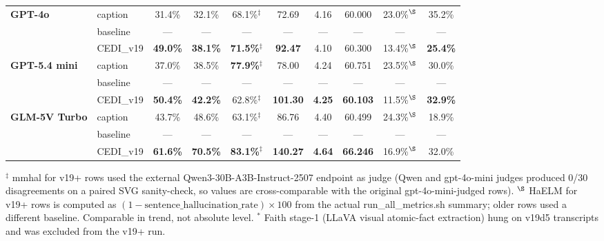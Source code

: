 \begin{table}[t]
\begin{tabular}{@{}l|l|cccccccc@{}}
\multirow{3}{*}{\parbox{2.5cm}{\centering\textbf{GPT-4o}}}
  & caption    & 31.4\% & 32.1\% & 68.1\%$^\ddagger$ & 72.69 & 4.16 & 60.000 & 23.0\%$^\S$ & 35.2\% \\
  & baseline   & --- & --- & --- & --- & --- & --- & --- & --- \\
\rowcolor[HTML]{E6F2FF}
  \multicolumn{1}{l}{\cellcolor[HTML]{E6F2FF}} & CEDI\_v19 & \textbf{49.0\%} & \textbf{38.1\%} & \textbf{71.5\%}$^\ddagger$ & \textbf{92.47} & 4.10 & 60.300 & 13.4\%$^\S$ & \textbf{25.4\%} \\
\midrule
\multirow{3}{*}{\parbox{2.5cm}{\centering\textbf{GPT-5.4 mini}}}
  & caption    & 37.0\% & 38.5\% & \textbf{77.9\%}$^\ddagger$ & 78.00 & 4.24 & 60.751 & 23.5\%$^\S$ & 30.0\% \\
  & baseline   & --- & --- & --- & --- & --- & --- & --- & --- \\
\rowcolor[HTML]{E6F2FF}
  \multicolumn{1}{l}{\cellcolor[HTML]{E6F2FF}} & CEDI\_v19 & \textbf{50.4\%} & \textbf{42.2\%} & 62.8\%$^\ddagger$ & \textbf{101.30} & \textbf{4.25} & \textbf{60.103} & 11.5\%$^\S$ & \textbf{32.9\%} \\
\midrule
\multirow{3}{*}{\parbox{2.5cm}{\centering\textbf{GLM-5V Turbo}}}
  & caption    & 43.7\% & 48.6\% & 63.1\%$^\ddagger$ & 86.76 & 4.40 & 60.499 & 24.3\%$^\S$ & 18.9\% \\
  & baseline   & --- & --- & --- & --- & --- & --- & --- & --- \\
\rowcolor[HTML]{E6F2FF}
  \multicolumn{1}{l}{\cellcolor[HTML]{E6F2FF}} & CEDI\_v19 & \textbf{61.6\%} & \textbf{70.5\%} & \textbf{83.1\%}$^\ddagger$ & \textbf{140.27} & \textbf{4.64} & \textbf{66.246} & 16.9\%$^\S$ & 32.0\% \\
\bottomrule
\end{tabular}

\vspace{2pt}
\footnotesize
\noindent
$^\ddagger$ mmhal for v19+ rows used the external Qwen3-30B-A3B-Instruct-2507 endpoint as judge (Qwen and gpt-4o-mini judges produced 0/30 disagreements on a paired SVG sanity-check, so values are cross-comparable with the original gpt-4o-mini-judged rows).
\quad
$^\S$ HaELM for v19+ rows is computed as $(1-\text{sentence\_hallucination\_rate})\times 100$ from the actual run\_all\_metrics.sh summary; older rows used a different baseline. Comparable in trend, not absolute level.
\quad
$^\ast$ Faith stage-1 (LLaVA visual atomic-fact extraction) hung on v19d5 transcripts and was excluded from the v19+ run.

\end{table}